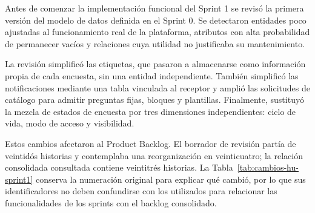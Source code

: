 \documentclass[11pt,a4paper]{report}
\begin{document}
Antes de comenzar la implementación funcional del Sprint 1 se revisó la primera versión del modelo de datos definida en el Sprint 0. Se detectaron entidades poco ajustadas al funcionamiento real de la plataforma, atributos con alta probabilidad de permanecer vacíos y relaciones cuya utilidad no justificaba su mantenimiento.

La revisión simplificó las etiquetas, que pasaron a almacenarse como información propia de cada encuesta, sin una entidad independiente. También simplificó las notificaciones mediante una tabla vinculada al receptor y amplió las solicitudes de catálogo para admitir preguntas fijas, bloques y plantillas. Finalmente, sustituyó la mezcla de estados de encuesta por tres dimensiones independientes: ciclo de vida, modo de acceso y visibilidad.

Estos cambios afectaron al Product Backlog. El borrador de revisión partía de veintidós historias y contemplaba una reorganización en veinticuatro; la relación consolidada consultada contiene veintitrés historias. La Tabla~\ref{tab:cambios-hu-sprint1} conserva la numeración original para explicar qué cambió, por lo que sus identificadores no deben confundirse con los utilizados para relacionar las funcionalidades de los sprints con el backlog consolidado.
\end{document}
